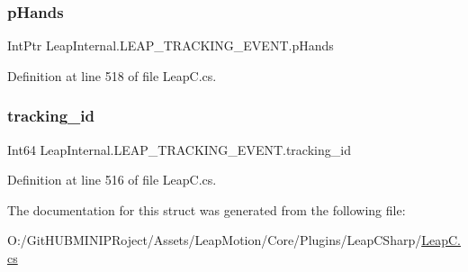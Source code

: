 \subsubsection{\texorpdfstring{pHands}{pHands}}
{\footnotesize\ttfamily Int\+Ptr Leap\+Internal.\+L\+E\+A\+P\+\_\+\+T\+R\+A\+C\+K\+I\+N\+G\+\_\+\+E\+V\+E\+N\+T.\+p\+Hands}



Definition at line 518 of file Leap\+C.\+cs.

\mbox{\label{struct_leap_internal_1_1_l_e_a_p___t_r_a_c_k_i_n_g___e_v_e_n_t_a4c75e2c555e3d5452e1fe5d0355350f5}} 
\subsubsection{\texorpdfstring{tracking\_id}{tracking\_id}}
{\footnotesize\ttfamily Int64 Leap\+Internal.\+L\+E\+A\+P\+\_\+\+T\+R\+A\+C\+K\+I\+N\+G\+\_\+\+E\+V\+E\+N\+T.\+tracking\+\_\+id}



Definition at line 516 of file Leap\+C.\+cs.



The documentation for this struct was generated from the following file\+:\begin{DoxyCompactItemize}
\item 
O\+:/\+Git\+H\+U\+B\+M\+I\+N\+I\+P\+Roject/\+Assets/\+Leap\+Motion/\+Core/\+Plugins/\+Leap\+C\+Sharp/\mbox{\hyperlink{_leap_c_8cs}{Leap\+C.\+cs}}\end{DoxyCompactItemize}
